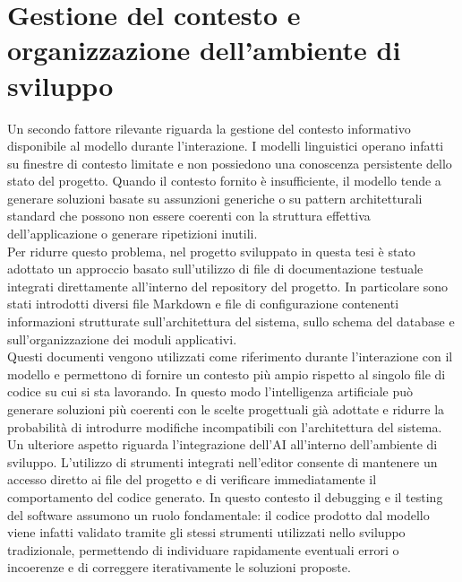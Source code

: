 \section{Gestione del contesto e organizzazione dell'ambiente di sviluppo}

Un secondo fattore rilevante riguarda la gestione del contesto informativo disponibile al modello durante l'interazione. I modelli linguistici operano infatti su finestre di contesto limitate e non possiedono una conoscenza persistente dello stato del progetto. Quando il contesto fornito è insufficiente, il modello tende a generare soluzioni basate su assunzioni generiche o su pattern architetturali standard che possono non essere coerenti con la struttura effettiva dell'applicazione o generare ripetizioni inutili.
\\
Per ridurre questo problema, nel progetto sviluppato in questa tesi è stato adottato un approccio basato sull'utilizzo di file di documentazione testuale integrati direttamente all'interno del repository del progetto. In particolare sono stati introdotti diversi file Markdown e file di configurazione contenenti informazioni strutturate sull'architettura del sistema, sullo schema del database e sull'organizzazione dei moduli applicativi.
\\
Questi documenti vengono utilizzati come riferimento durante l'interazione con il modello e permettono di fornire un contesto più ampio rispetto al singolo file di codice su cui si sta lavorando. In questo modo l'intelligenza artificiale può generare soluzioni più coerenti con le scelte progettuali già adottate e ridurre la probabilità di introdurre modifiche incompatibili con l'architettura del sistema.
\\
Un ulteriore aspetto riguarda l'integrazione dell'AI all'interno dell'ambiente di sviluppo. L'utilizzo di strumenti integrati nell'editor consente di mantenere un accesso diretto ai file del progetto e di verificare immediatamente il comportamento del codice generato. In questo contesto il debugging e il testing del software assumono un ruolo fondamentale: il codice prodotto dal modello viene infatti validato tramite gli stessi strumenti utilizzati nello sviluppo tradizionale, permettendo di individuare rapidamente eventuali errori o incoerenze e di correggere iterativamente le soluzioni proposte.

